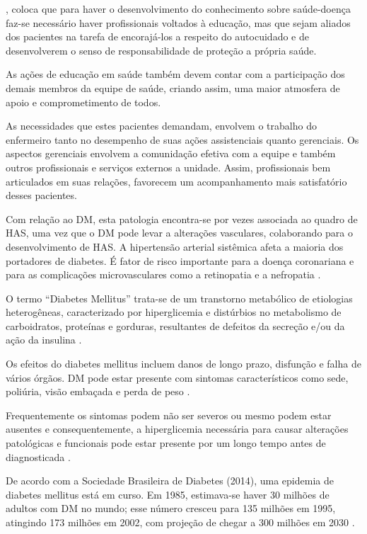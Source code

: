 , coloca que para haver o desenvolvimento do conhecimento sobre saúde-doença faz-se necessário haver profissionais voltados à educação, mas que sejam aliados dos pacientes na tarefa de encorajá-los a respeito do autocuidado e de desenvolverem o senso de responsabilidade de proteção a própria saúde. 

As ações de educação em saúde também devem contar com a participação dos demais membros da equipe de saúde, criando assim, uma maior atmosfera de apoio e comprometimento de todos. 

As necessidades que estes pacientes demandam, envolvem o trabalho do enfermeiro tanto no desempenho de suas ações assistenciais quanto gerenciais. Os aspectos gerenciais envolvem a comunidação efetiva com a equipe e também outros profissionais e serviços externos a unidade. Assim, profissionais bem articulados em suas relações, favorecem um acompanhamento mais satisfatório desses pacientes. 

Com relação ao \acrlong{DM}, esta patologia encontra-se por vezes associada ao quadro de HAS, uma vez que o DM pode levar a alterações vasculares, colaborando para o desenvolvimento de HAS. A hipertensão arterial sistêmica afeta a maioria dos portadores de diabetes. É fator de risco importante para a doença coronariana e para as complicações microvasculares como a retinopatia e a nefropatia \cite{atencaobasica16}.

O termo ``Diabetes Mellitus'' trata-se de um transtorno metabólico de etiologias heterogêneas, caracterizado por hiperglicemia e distúrbios no metabolismo de carboidratos, proteínas e gorduras, resultantes de defeitos da secreção e/ou da ação da insulina \cite{assal1999definition}.

Os efeitos do diabetes mellitus incluem danos de longo prazo, disfunção e falha de vários órgãos. DM pode estar presente com sintomas característicos como sede, poliúria, visão embaçada e perda de peso \cite{assal1999definition}.

Frequentemente os sintomas podem não ser severos ou mesmo podem estar ausentes e consequentemente, a hiperglicemia  necessária para causar alterações patológicas e funcionais pode estar presente por um longo tempo antes de diagnosticada \cite{assal1999definition}.

De acordo com a Sociedade Brasileira de Diabetes (2014), uma epidemia de diabetes mellitus está em curso. Em 1985, estimava-se haver 30 milhões de adultos com DM no mundo; esse número cresceu para 135 milhões em 1995, atingindo 173 milhões em 2002, com projeção de chegar a 300 milhões em 2030 \cite{sarah2004global}.

